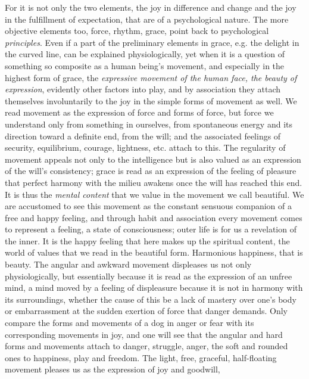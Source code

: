 \documentclass[12pt,a4paper,openany]{book}
\newcommand{\opage}[1]{\marginnote{\footnotesize\textit{[#1]}}}
\begin{document}
For it is not only the two elements, the joy in difference
and change and the joy in the fulfillment of expectation,
that are of a psychological nature. The more objective
elements too, force, rhythm, grace, point back to psychological
\emph{principles}. Even if a part of the preliminary elements
in grace, e.g. the delight in the curved line, can be explained
physiologically, yet when it is a question of something so
composite as a human being's movement, and especially in the
highest form of grace, the \emph{expressive movement of the human face,
the beauty of expression}, evidently
other factors into play, and by association they attach
\setcounter{footnote}{0}%
\opage{273}themselves involuntarily to the joy in the simple forms of movement as well.
We read movement as the expression of force and forms of force,
but force we understand only from something in ourselves, from
spontaneous energy and its direction toward a definite end,
from the will; and the associated feelings of security, equilibrium,
courage, lightness, etc. attach to this. The regularity of movement
appeals not only to the intelligence but is also valued as
an expression of the will's consistency; grace is read as an expression
of the feeling of pleasure that perfect harmony with
the milieu awakens once the will has reached this end. It is
thus the \emph{mental content} that we value in the movement
we call beautiful. We are accustomed to see this movement
as the constant sensuous companion of a free and happy
feeling, and through habit and association every movement comes
to represent a feeling, a state of consciousness;
outer life is for us a revelation of the inner. It is
the happy feeling that here makes up the spiritual content,
the world of values that we read in the beautiful form. Harmonious
happiness, that is beauty. The angular and awkward movement
displeases us not only physiologically, but essentially because
it is read as the expression of an unfree mind, a mind moved
by a feeling of displeasure because it is not in harmony with its
surroundings, whether the cause of this be a lack of mastery over one's
body or embarrassment at the sudden exertion of
force that danger demands. Only compare
the forms and movements of a dog in anger or fear
with its corresponding movements in joy, and one will see that
the angular and hard forms and movements attach to
danger, struggle, anger, the soft and rounded ones to happiness,
play and freedom. The light, free, graceful, half-floating
movement pleases us as the expression of joy and goodwill,
\end{document}
